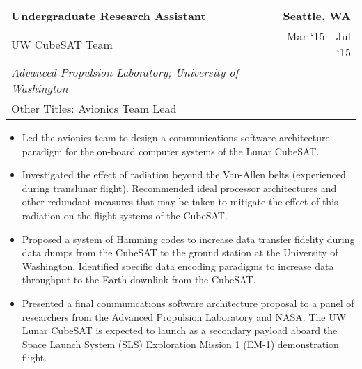 \documentclass[10pt, letterpaper]{article}
\newcommand{\tabularxwidth}{\textwidth}
\begin{document}
    \begin{minipage}{\tabularxwidth}

        \begin{tabularx}{\tabularxwidth}{X r}
            \textbf{Undergraduate Research Assistant} & \textbf{Seattle, 
        WA} \\
            UW CubeSAT Team & 
        
    Mar ‘15 - 
    Jul ‘15 \\
            
                
                    \textit{Advanced Propulsion Laboratory; University of Washington} & \\
                
            
            
                Other Titles: Avionics Team Lead & \\
            
        \end{tabularx}

        \begin{itemize}[noitemsep, topsep=3pt, parsep=0pt, partopsep=0pt]
            
                \item 
    Led the avionics team to design a communications software architecture paradigm for the on-board computer systems of the Lunar CubeSAT.
            
                \item 
    Investigated the effect of radiation beyond the Van-Allen belts (experienced during translunar flight). Recommended ideal processor architectures and other redundant measures that may be taken to mitigate the effect of this radiation on the flight systems of the CubeSAT.
            
                \item 
    Proposed a system of Hamming codes to increase data transfer fidelity during data dumps from the CubeSAT to the ground station at the University of Washington. Identified specific data encoding paradigms to increase data throughput to the Earth downlink from the CubeSAT.
            
                \item 
    Presented a final communications software architecture proposal to a panel of researchers from the Advanced Propulsion Laboratory and NASA. The UW Lunar CubeSAT is expected to launch as a secondary payload aboard the Space Launch System (SLS) Exploration Mission 1 (EM-1) demonstration flight.
            
        \end{itemize}

        
            \vspace{.5em}
        

    \end{minipage}
    
\end{document}
